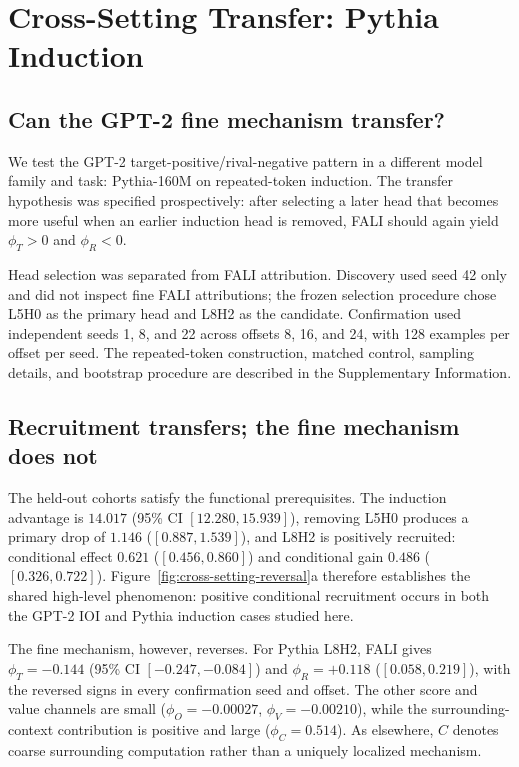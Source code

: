 \section{Cross-Setting Transfer: Pythia Induction}\label{sec:pythia}

\subsection{Can the GPT-2 fine mechanism transfer?}\label{sec:pythia-design}

We test the GPT-2 target-positive/rival-negative pattern in a different model family and task: Pythia-160M on repeated-token induction. The transfer hypothesis was specified prospectively: after selecting a later head that becomes more useful when an earlier induction head is removed, FALI should again yield $\phi_T>0$ and $\phi_R<0$.

Head selection was separated from FALI attribution. Discovery used seed 42 only and did not inspect fine FALI attributions; the frozen selection procedure chose L5H0 as the primary head and L8H2 as the candidate. Confirmation used independent seeds 1, 8, and 22 across offsets 8, 16, and 24, with 128 examples per offset per seed. The repeated-token construction, matched control, sampling details, and bootstrap procedure are described in the Supplementary Information.

\subsection{Recruitment transfers; the fine mechanism does not}\label{sec:pythia-results}

The held-out cohorts satisfy the functional prerequisites. The induction advantage is $14.017$ (95\% CI $[12.280,15.939]$), removing L5H0 produces a primary drop of $1.146$ ($[0.887,1.539]$), and L8H2 is positively recruited: conditional effect $0.621$ ($[0.456,0.860]$) and conditional gain $0.486$ ($[0.326,0.722]$). Figure~\ref{fig:cross-setting-reversal}a therefore establishes the shared high-level phenomenon: positive conditional recruitment occurs in both the GPT-2 IOI and Pythia induction cases studied here.

The fine mechanism, however, reverses. For Pythia L8H2, FALI gives $\phi_T=-0.144$ (95\% CI $[-0.247,-0.084]$) and $\phi_R=+0.118$ ($[0.058,0.219]$), with the reversed signs in every confirmation seed and offset. The other score and value channels are small ($\phi_O=-0.00027$, $\phi_V=-0.00210$), while the surrounding-context contribution is positive and large ($\phi_C=0.514$). As elsewhere, $C$ denotes coarse surrounding computation rather than a uniquely localized mechanism.

